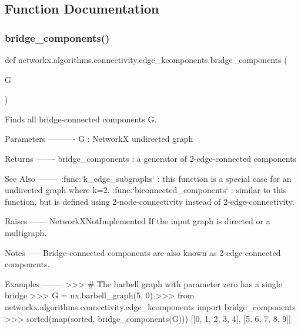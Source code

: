 \subsection{Function Documentation}
\mbox{\label{namespacenetworkx_1_1algorithms_1_1connectivity_1_1edge__kcomponents_a37f92268daf27cb5c79593656e3c5958}} 
\subsubsection{\texorpdfstring{bridge\+\_\+components()}{bridge\_components()}}
{\footnotesize\ttfamily def networkx.\+algorithms.\+connectivity.\+edge\+\_\+kcomponents.\+bridge\+\_\+components (\begin{DoxyParamCaption}\item[{}]{G }\end{DoxyParamCaption})}

\begin{DoxyVerb}Finds all bridge-connected components G.

Parameters
----------
G : NetworkX undirected graph

Returns
-------
bridge_components : a generator of 2-edge-connected components


See Also
--------
:func:`k_edge_subgraphs` : this function is a special case for an
    undirected graph where k=2.
:func:`biconnected_components` : similar to this function, but is defined
    using 2-node-connectivity instead of 2-edge-connectivity.

Raises
------
NetworkXNotImplemented
    If the input graph is directed or a multigraph.

Notes
-----
Bridge-connected components are also known as 2-edge-connected components.

Examples
--------
>>> # The barbell graph with parameter zero has a single bridge
>>> G = nx.barbell_graph(5, 0)
>>> from networkx.algorithms.connectivity.edge_kcomponents import bridge_components
>>> sorted(map(sorted, bridge_components(G)))
[[0, 1, 2, 3, 4], [5, 6, 7, 8, 9]]
\end{DoxyVerb}
 \mbox{\label{namespacenetworkx_1_1algorithms_1_1connectivity_1_1edge__kcomponents_a37593586a0ba623692e0b34dae6a6cb8}} 
